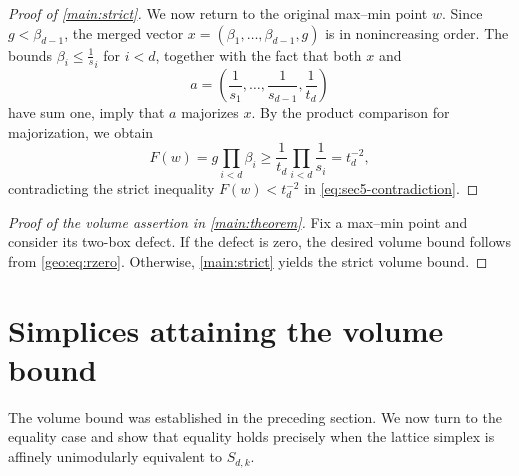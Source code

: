 \documentclass[reqno, 11pt]{article}
\numberwithin{equation}{section}
\theoremstyle{definition}
\begin{document}
\begin{proof}[Proof of \cref{main:strict}]
We now return to the original max--min point $w$.
Since $g<\beta_{d-1}$, the merged vector
$x=(\beta_1,\ldots,\beta_{d-1},g)$ is in nonincreasing order.
The bounds $\beta_i\le\frac1s_i$ for $i<d$, together
with the fact that both $x$ and
\[
a=\left(\frac1{s_1},\ldots,\frac1{s_{d-1}},
\frac1{t_d}\right)
\]
have sum one, imply that $a$ majorizes $x$.
By the product comparison for majorization, we obtain
\[
F(w)=g\prod_{i<d}\beta_i
\ge\frac1{t_d}\prod_{i<d}\frac1{s_i}
=t_d^{-2},
\]
contradicting the strict inequality
$F(w)<t_d^{-2}$ in \eqref{eq:sec5-contradiction}.


\end{proof}

\begin{proof}[Proof of the volume assertion in \cref{main:theorem}]
Fix a max--min point and consider its two-box defect. If the defect is zero, the desired volume bound follows from \eqref{geo:eq:rzero}. Otherwise, \cref{main:strict} yields the strict volume bound.
\end{proof}


\section{Simplices attaining the volume bound}\label{sec:equality}

The volume bound was established in the preceding section. We now turn to the equality case and show that equality holds precisely when the lattice simplex is affinely unimodularly equivalent to $S_{d,k}$.
\end{document}
